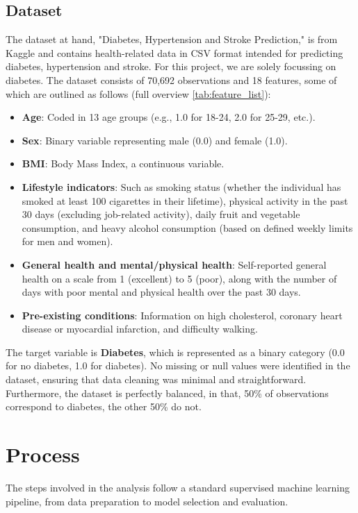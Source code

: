 \documentclass[a4paper,12pt]{article}
\begin{document}
\subsection{Dataset}
The dataset at hand, "Diabetes, Hypertension and Stroke Prediction," is from Kaggle and contains 
health-related data in CSV format intended for predicting diabetes, hypertension and stroke. 
For this project, we are solely focussing on diabetes. The dataset consists of 70,692 observations 
and 18 features, some of which are outlined as follows (full overview \ref{tab:feature_list}):
\begin{itemize}
    \item \textbf{Age}: Coded in 13 age groups (e.g., 1.0 for 18-24, 2.0 for 25-29, etc.).
    \item \textbf{Sex}: Binary variable representing male (0.0) and female (1.0).
    \item \textbf{BMI}: Body Mass Index, a continuous variable.
    \item \textbf{Lifestyle indicators}: Such as smoking status (whether the individual has smoked at least 100 cigarettes in their lifetime), physical activity in the past 30 days (excluding job-related activity), daily fruit and vegetable consumption, and heavy alcohol consumption (based on defined weekly limits for men and women).
    \item \textbf{General health and mental/physical health}: Self-reported general health on a scale from 1 (excellent) to 5 (poor), along with the number of days with poor mental and physical health over the past 30 days.
    \item \textbf{Pre-existing conditions}: Information on high cholesterol, coronary heart disease or myocardial infarction, and difficulty walking.
\end{itemize}

The target variable is \textbf{Diabetes}, which is represented as a binary category 
(0.0 for no diabetes, 1.0 for diabetes). No missing or null values were identified in the dataset, 
ensuring that data cleaning was minimal and straightforward. Furthermore, the dataset is perfectly 
balanced, in that, 50\% of observations correspond to diabetes, the other 50\% do not.

\section{Process}
The steps involved in the analysis follow a standard supervised machine learning pipeline, 
from data preparation to model selection and evaluation.
\end{document}
